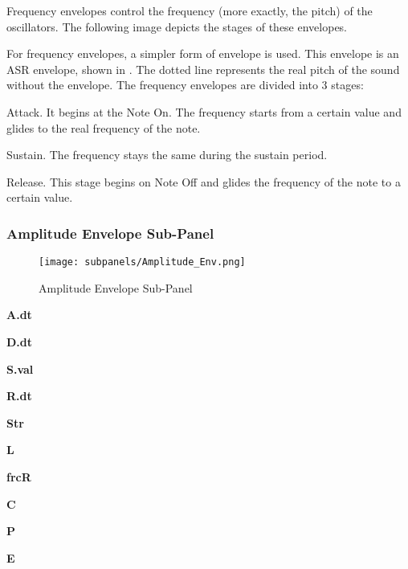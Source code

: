    Frequency envelopes control the frequency (more exactly, the pitch) of the
   oscillators. The following image depicts the stages of these envelopes.

   For frequency envelopes, a simpler form of envelope is used.
   This envelope is an ASR envelope, shown in
   .
   The dotted line represents the real pitch of the sound without the envelope.
   The frequency envelopes are divided into 3 stages:

   \begin{enumber}
      \item Attack. 
      It begins at the Note On. The frequency starts from a certain value and
      glides to the real frequency of the note.
      \item Sustain.
      The frequency stays the same during the sustain period.
      \item Release.
      This stage begins on Note Off and glides the frequency of the note to a
      certain value.
   \end{enumber}

\subsubsection{Amplitude Envelope Sub-Panel}
\label{subsubsec:amplitude_envelope_subpanel}

\begin{figure}[H]
   \centering 
   \texttt{[image: subpanels/Amplitude\_Env.png]}
   \caption[Amplitude Envelope Sub-Panel]{Amplitude Envelope Sub-Panel}
   \label{fig:amplitude_env}
\end{figure}

   \begin{enumber}
      \item \textbf{A.dt}
      \item \textbf{D.dt}
      \item \textbf{S.val}
      \item \textbf{R.dt}
      \item \textbf{Str}
      \item \textbf{L}
      \item \textbf{frcR}
      \item \textbf{C}
      \item \textbf{P}
      \item \textbf{E}
   \end{enumber}

   \setcounter{ItemCounter}{0}      %

